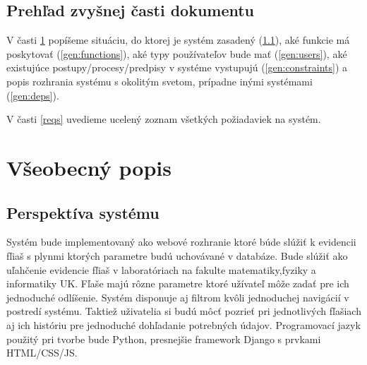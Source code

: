\documentclass[hreffootnote]{zah}
\begin{document}
\subsection{Prehľad zvyšnej časti dokumentu}

V časti \ref{general} popíšeme situáciu, do ktorej je systém zasadený (\ref{gen:perspective}), aké funkcie má poskytovať (\ref{gen:functions}), aké typy používateľov bude mať (\ref{gen:users}), aké existujúce postupy/procesy/predpisy v systéme vystupujú (\ref{gen:constraints}) a popis rozhrania systému s okolitým svetom, prípadne inými systémami (\ref{gen:deps}).

V časti \ref{reqs} uvedieme ucelený zoznam všetkých požiadaviek na systém.

\cleardoublepage
\section{Všeobecný popis}
\label{general}

\subsection{Perspektíva systému}
\label{gen:perspective}
Systém bude implementovaný ako webové rozhranie ktoré búde slúžiť k evidencii fľiaš s plynmi ktorých parametre budú uchovávané v databáze. Bude slúžiť ako uľahčenie evidencie fľiaš v laboratóriach na fakulte matematiky,fyziky a informatiky UK. Fľaše majú rôzne parametre ktoré užívateľ môže zadať pre ich jednoduché odlíšenie. Systém disponuje aj filtrom  kvôli jednoduchej navigácií v postredí systému. Taktiež uživatelia si budú môcť pozrieť pri jednotlivých fľašiach aj ich históriu pre jednoduché dohľadanie potrebných údajov. Programovací jazyk použitý pri tvorbe bude Python, presnejšie framework Django s prvkami HTML/CSS/JS.
\end{document}
